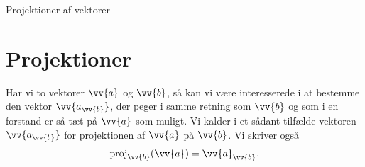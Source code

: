 
\begin{center}
\Huge
Projektioner af vektorer
\end{center}

\section*{Projektioner}

Har vi to vektorer $\vv{a}$ og $\vv{b}$, så kan vi være interesserede i at bestemme den vektor $\vv{a_{\vv{b}}}$, der peger i samme retning som $\vv{b}$ og som i en forstand er så tæt på $\vv{a}$ som muligt. Vi kalder i et sådant tilfælde vektoren $\vv{a_{\vv{b}}}$ for projektionen af $\vv{a}$ på $\vv{b}$. Vi skriver også 
\begin{align*}
\textnormal{proj}_{\vv{b}}(\vv{a}) = \vv{a}_{\vv{b}}.
\end{align*}

